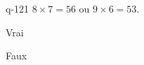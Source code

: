 \begin{truefalse}{q-121}
$8\times 7 = 56$ ou $9\times 6 = 53$.
\item* Vrai
\item Faux
\end{truefalse}

